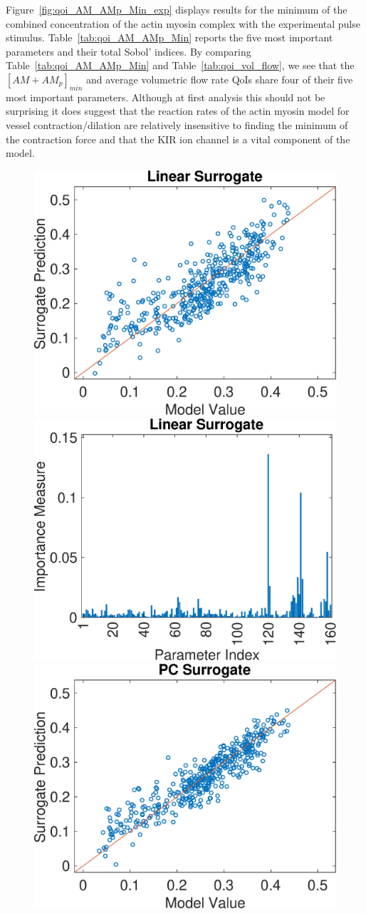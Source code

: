 Figure~\ref{fig:qoi_AM_AMp_Min_exp} displays results for the minimum of the combined concentration of the actin myosin complex with the experimental pulse stimulus. Table~\ref{tab:qoi_AM_AMp_Min} reports the five most important parameters and their total Sobol' indices. By comparing Table~\ref{tab:qoi_AM_AMp_Min} and Table~\ref{tab:qoi_vol_flow}, we see that the $[AM+AM_p]_{min}$ and average volumetric flow rate QoIs share four of their five most important parameters. Although at first analysis this should not be surprising it does suggest that the reaction rates of the actin myosin model for vessel contraction/dilation are relatively insensitive to finding the minimum of the contraction force and that the KIR ion channel is a vital component of the model. 
\begin{figure}[h]
\centering
\includegraphics[width=.46 \textwidth]{Figures/AM_AMp_Min_QoI_LR_Prediction_Experimental.eps}
\hspace{.1 cm}
\includegraphics[width=.475 \textwidth]{Figures/AM_AMp_Min_QoI_LR_VI_Experimental.eps} \\
\vspace{.2 cm}
\includegraphics[width=.46 \textwidth]{Figures/AM_AMp_Min_QoI_PCE_Prediction_Experimental.eps}

\end{figure}
